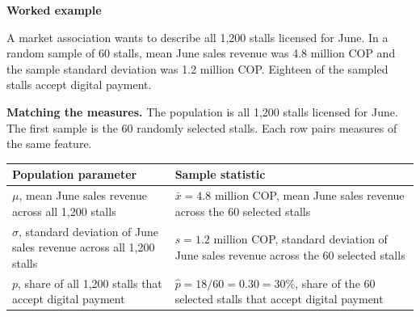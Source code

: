 
\vspace{-3mm}
\begin{center}
	{\large\bfseries Worked example}
\end{center}
\vspace{-13mm}

A market association wants to describe all 1,200 stalls licensed for June.
In a random sample of 60 stalls, mean June sales revenue was 4.8 million COP
and the sample standard deviation was 1.2 million COP. Eighteen of the sampled
stalls accept digital payment.


\textbf{Matching the measures.}
The population is all 1,200 stalls licensed for June. The first sample is the
60 randomly selected stalls. Each row pairs measures of the same feature.

\begin{tabularx}{\linewidth}{|L|L|}
    \hline
    \textbf{Population parameter} & \textbf{Sample statistic} \\ \hline
    $\mu$, mean June sales revenue across all 1,200 stalls
      & $\bar{x}=4.8$ million COP, mean June sales revenue across the 60 selected stalls \\ \hline
    $\sigma$, standard deviation of June sales revenue across all 1,200 stalls
      & $s=1.2$ million COP, standard deviation of June sales revenue across the 60 selected stalls \\ \hline
    $p$, share of all 1,200 stalls that accept digital payment
      & $\hat p=18/60=0.30=30\%$, share of the 60 selected stalls that accept digital payment \\ \hline
\end{tabularx}

